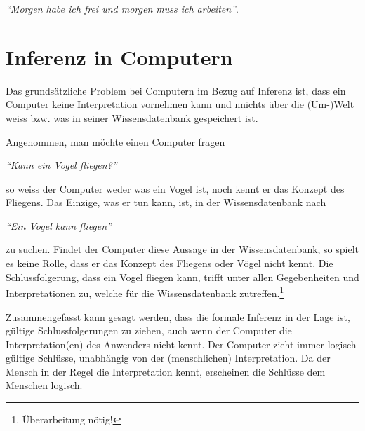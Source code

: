     \noindent\hspace*{12mm}\textit{``Morgen habe ich frei und morgen muss ich arbeiten''}.

\section{Inferenz in Computern}
\label{sec:inferenz-in-computer}

Das grundsätzliche Problem bei Computern im Bezug auf Inferenz ist, dass ein Computer keine Interpretation vornehmen kann und nnichts über die (Um-)Welt weiss bzw. was in seiner Wissensdatenbank gespeichert ist.

Angenommen, man möchte einen Computer fragen

    \noindent\hspace*{12mm}\textit{``Kann ein Vogel fliegen?''}

so weiss der Computer weder was ein Vogel ist, noch kennt er das Konzept des Fliegens. Das Einzige, was er tun kann, ist, in der Wissensdatenbank nach 

    \noindent\hspace*{12mm}\textit{``Ein Vogel kann fliegen''}

zu suchen. Findet der Computer diese Aussage in der Wissensdatenbank, so spielt es keine Rolle, dass er das Konzept des Fliegens oder Vögel nicht kennt. Die Schlussfolgerung, dass ein Vogel fliegen kann, trifft unter allen Gegebenheiten und Interpretationen zu, welche für die Wissensdatenbank zutreffen.\footnote{Überarbeitung nötig!}

Zusammengefasst kann gesagt werden, dass die formale Inferenz in der Lage ist, gültige Schlussfolgerungen zu ziehen, auch wenn der Computer die Interpretation(en) des Anwenders nicht kennt. Der Computer zieht immer logisch gültige Schlüsse, unabhängig von der (menschlichen) Interpretation. Da der Mensch in der Regel die Interpretation kennt, erscheinen die Schlüsse dem Menschen logisch.

